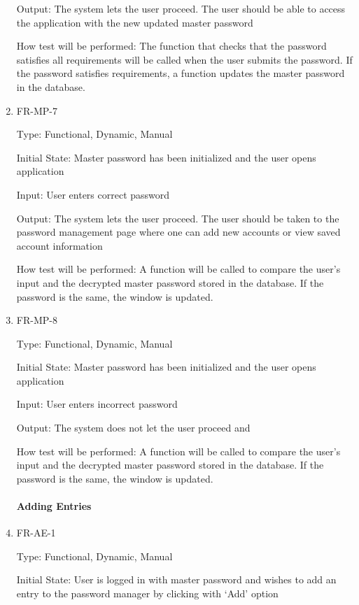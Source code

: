 \documentclass[12pt, titlepage]{article}
\begin{document}
\begin{enumerate}
Output: The system lets the user proceed. The user should be able to access the application with the new updated master password

How test will be performed: The function that checks that the password satisfies all requirements will be called when the user submits the password. If the password satisfies requirements, a function updates the master password in the database.

\item{FR-MP-7\\}

Type: Functional, Dynamic, Manual

Initial State: Master password has been initialized and the user opens application

Input: User enters correct password

Output: The system lets the user proceed. The user should be taken to the password management page where one can add new accounts or view saved account information

How test will be performed: A function will be called to compare the user’s input and the decrypted master password stored in the database. If the password is the same, the window is updated.

\item{FR-MP-8\\}

Type: Functional, Dynamic, Manual

Initial State: Master password has been initialized and the user opens application

Input: User enters incorrect password

Output: The system does not let the user proceed and 

How test will be performed: A function will be called to compare the user’s input and the decrypted master password stored in the database. If the password is the same, the window is updated.

\paragraph{Adding Entries}

\item{FR-AE-1\\}

Type: Functional, Dynamic, Manual

Initial State: User is logged in with master password and wishes to add an entry to the password manager by clicking with ‘Add’ option


\end{enumerate}
\end{document}
